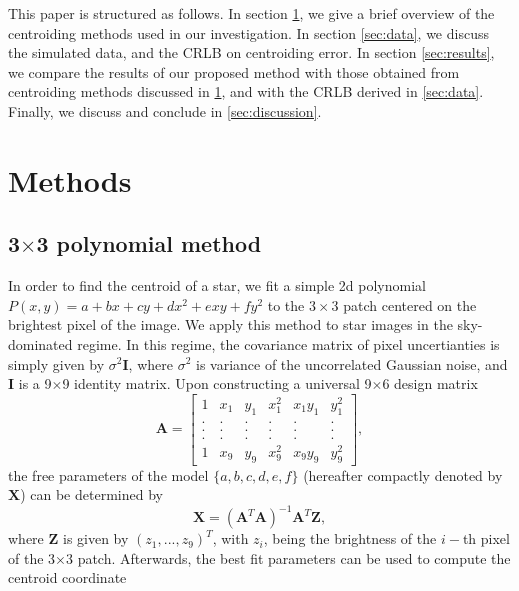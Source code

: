 \documentclass[12pt, preprint]{aastex}
\newcommand{\beq}{\begin{equation}}
\newcommand{\eeq}{\end{equation}}
\begin{document}
This paper is structured as follows. In section \ref{sec:method},
we give a brief overview of the centroiding methods used in our investigation.
In section \ref{sec:data}, we discuss the simulated data, and the CRLB on centroiding error.
In section \ref{sec:results}, we compare the results of our proposed method with 
those obtained from centroiding methods discussed in \ref{sec:method}, and 
with the CRLB derived in \ref{sec:data}. Finally, we discuss and conclude
in \ref{sec:discussion}.               

\section{Methods}\label{sec:method}

\subsection{3$\times$3 polynomial method}

In order to find the centroid of a star, 
we fit a simple 2d polynomial $P(x,y)=a+bx+cy+dx^2+exy+fy^2$ to the
$3\times3$ patch centered on the brightest pixel of the
image. We apply this method to star images in the sky-dominated regime.
In this regime, the covariance matrix of pixel uncertianties is simply
given by $\sigma^{2}\mathbf{I}$, where $\sigma^{2}$ is variance of the
uncorrelated Gaussian noise, and $\mathbf{I}$ is a 9$\times$9 identity matrix.
Upon constructing a universal 9$\times$6 design matrix
\begin{equation}
    \mathbf{A} = 
    \begin{bmatrix}
        1 & x_{1} & y_{1} & x_{1}^{2} & x_{1}y_{1} & y_{1}^{2} \\
        . & . & . & . & . & .  \\
        . & . & . & . & . & .  \\
        . & . & . & . & . & .  \\
        1 & x_{9} & y_{9} & x_{9}^{2} & x_{9}y_{9} & y_{9}^{2}
    \end{bmatrix},
\end{equation}
the free parameters of the model $\{a,b,c,d,e,f\}$
(hereafter compactly denoted by $\mathbf{X}$) can be determined by 
\beq
\mathbf{X} = (\mathbf{A}^{T}\mathbf{A})^{-1}\mathbf{A}^{T}\mathbf{Z},
\label{linearfit}
\eeq
where $\mathbf{Z}$ is given by $(z_{1},...,z_{9})^{T}$,
with $z_{i}$, being the brightness of the $i-$th pixel of the 3$\times$3 patch.
Afterwards, the best fit parameters can be used to compute the centroid coordinate
\end{document}
